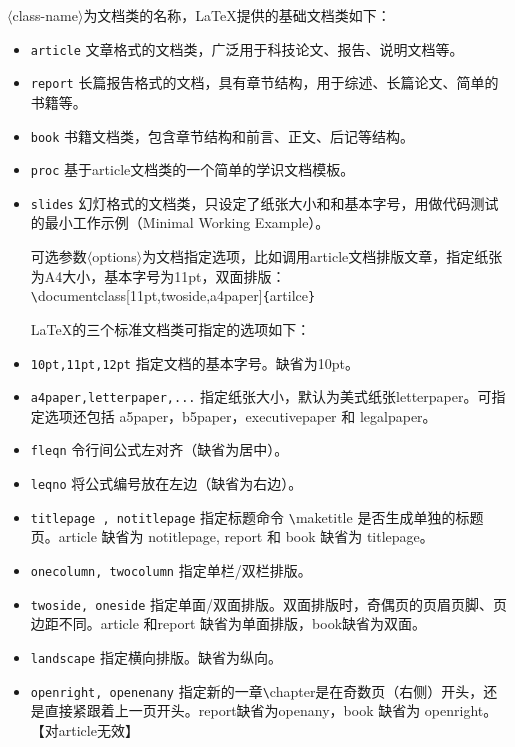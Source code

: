\documentclass[UTF8]{ctexart}
\begin{document}
$\langle$class-name$\rangle$为文档类的名称，\LaTeX 提供的基础文档类如下：
\begin{itemize}
    \item \texttt{article} 文章格式的文档类，广泛用于科技论文、报告、说明文档等。
  \item \texttt{report} 长篇报告格式的文档，具有章节结构，用于综述、长篇论文、简单的书籍等。
  \item \texttt{book} 书籍文档类，包含章节结构和前言、正文、后记等结构。
  \item \texttt{proc} 基于article文档类的一个简单的学识文档模板。
  \item \texttt{slides} 幻灯格式的文档类，只设定了纸张大小和和基本字号，用做代码测试的最小工作示例（Minimal Working Example）。

可选参数$\langle$options$\rangle$为文档指定选项，比如调用article文档排版文章，指定纸张为A4大小，基本字号为11pt，双面排版：\texttt{\textbackslash}documentclass[11pt,twoside,a4paper]\texttt{\{}artilce\texttt{\}}

\LaTeX 的三个标准文档类可指定的选项如下：
  \item \texttt{10pt,11pt,12pt} 指定文档的基本字号。缺省为10pt。
  \item \texttt{a4paper,letterpaper,...} 指定纸张大小，默认为美式纸张letterpaper。可指定选项还包括 a5paper，b5paper，executivepaper 和 legalpaper。
  \item \texttt{fleqn} 令行间公式左对齐（缺省为居中）。
  \item \texttt{leqno} 将公式编号放在左边（缺省为右边）。
  \item \texttt{titlepage , notitlepage} 指定标题命令 \texttt{\textbackslash}maketitle 是否生成单独的标题页。article 缺省为 notitlepage, report 和 book 缺省为 titlepage。
  \item \texttt{onecolumn, twocolumn} 指定单栏/双栏排版。
  \item \texttt{twoside, oneside} 指定单面/双面排版。双面排版时，奇偶页的页眉页脚、页边距不同。article 和report 缺省为单面排版，book缺省为双面。
  \item \texttt{landscape} 指定横向排版。缺省为纵向。
  \item \texttt{openright, openenany} 指定新的一章\texttt{\textbackslash}chapter是在奇数页（右侧）开头，还是直接紧跟着上一页开头。report缺省为openany，book 缺省为 openright。【对article无效】
\end{itemize}
\end{document}

